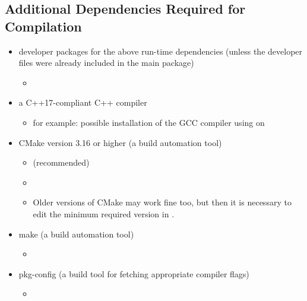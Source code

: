 \documentclass[11pt,a4paper,twoside,openright]{report}
\begin{document}
\subsection{Additional Dependencies Required for Compilation}\label{sec:compiledeps}
\begin{itemize}
	\item developer packages for the above run-time dependencies (unless the developer files were already included in the main package)
		\begin{itemize}
			\item \pubinst
				\vspace*{5pt}

				\\
				\vspace*{5pt}
		\end{itemize}
	\item a C++17-compliant C++ compiler
		\begin{itemize}
			\item for example: possible installation of the GCC compiler using  on 
		\end{itemize}
	\item CMake version 3.16 or higher (a build automation tool)
		\begin{itemize}
			\item \psubinst{} (recommended)
			\item \pubinst
			\item Older versions of CMake may work fine too, but then it is necessary to edit the minimum required version in .
		\end{itemize}
	\item make (a build automation tool)
		\begin{itemize}
			\item \pubinst
		\end{itemize}
	\item pkg-config (a build tool for fetching appropriate compiler flags)
		\begin{itemize}
			\item \pubinst
		\end{itemize}
\end{itemize}
\end{document}
